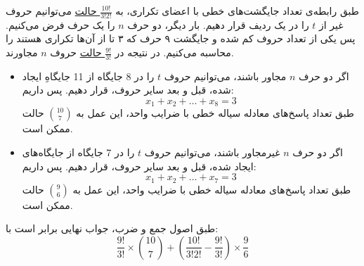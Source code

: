\p
طبق رابطه‌ی تعداد جایگشت‌های خطی با اعضای تکراری،
به
\underline{$\frac{10!}{3!2!}$ حالت}
 می‌توانیم حروف غیر از 
$t$ را در یک ردیف قرار دهیم.
بار دیگر، دو حرف
$n$ 
را یک حرف فرض می‌کنیم. پس یکی از تعداد حروف کم شده و جایگشت ۹ حرف که ۳ تا از آن‌ها تکراری هستند را 
محاسبه می‌کنیم.
در نتیجه در 
\underline{$\frac{9!}{3!}$ حالت} 
 حروف 
$n$ مجاورند.
\begin{itemize}
\item 
اگر دو حرف
 $n$ 
 مجاور باشند، می‌توانیم حروف 
 $t$
 را در 8 جایگاه‌ از 11 جایگاه‌ِ ایجاد شده، قبل و بعد سایر حروف، قرار دهیم. پس داریم:
$$x_1 + x_2 + \ldots + x_8 = 3$$
طبق تعداد پاسخ‌های معادله سیاله خطی با ضرایب واحد،
اين عمل به 
\underline{$\binom{10}{7}$}
حالت ممكن
است.

\item 
اگر دو حرف
$n$ 
غیرمجاور باشند، می‌توانیم حروف
$t$ 
را در 7 جایگاه‌ از جایگاه‌های ایجاد شده، قبل و بعد سایر حروف، قرار دهیم. پس داریم:
$$x_1 + x_2 + \ldots + x_7 = 3$$
طبق تعداد پاسخ‌های معادله سیاله خطی با ضرایب واحد،
اين عمل به 
\underline{$\binom{9}{6}$}
حالت ممكن
است.
\end{itemize}

\p
طبق اصول جمع و ضرب، جواب نهایی برابر است با:
$$\frac{9!}{3!}\times\binom{10}{7} + (\frac{10!}{3!2!} - \frac{9!}{3!})\times\frac{9}{6}$$
